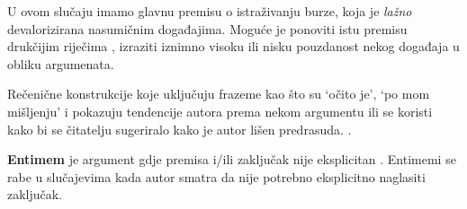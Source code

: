 \vspace{2 mm}

U ovom slučaju imamo glavnu premisu o istraživanju burze, koja je \emph{lažno} devalorizirana nasumičnim događajima. Moguće je ponoviti istu premisu drukčijim riječima , izraziti iznimno visoku  ili nisku pouzdanost  nekog događaja u obliku argumenata. 

 \vspace{2 mm}

Rečenične konstrukcije koje uključuju frazeme kao što su `očito je', `po mom
mišljenju' i pokazuju tendencije autora prema nekom argumentu ili se koristi
kako bi se čitatelju sugeriralo kako je autor lišen predrasuda.
\citep{harrellcreating}. 

\textbf{Entimem}  je argument gdje premisa i/ili zaključak nije
eksplicitan \citep{bitzer1959aristotle}. Entimemi se rabe u slučajevima kada
autor smatra da nije potrebno eksplicitno naglasiti zaključak.

